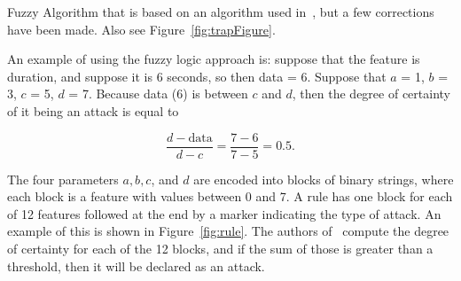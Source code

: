 \documentclass{sig-alternate}
\begin{document}
\begin{algorithm}[t]
\caption{Fuzzy Algorithm that is based on an algorithm used in~\cite{6496342, 6559603}, but a few corrections have been made. Also see Figure~\ref{fig:trapFigure}.}
\label{alg:fuzAlg}
\begin{algorithmic}
\ELSE {}
\ENDIF
\end{algorithmic}
\end{algorithm}

An example of using the fuzzy logic approach is: suppose that the feature is duration, and suppose it is 6 seconds, so then data = 6. Suppose that $a$ = 1, $b$ = 3, $c$ = 5, $d$ = 7. Because data (6) is between $c$ and $d$, then the degree of certainty of it being an attack is equal to

\begin{equation*}
\frac{d-\textrm{data}}{d-c} = \frac{7-6}{7-5} = 0.5.
\end{equation*}




\newpage




The four parameters $a, b, c$, and $d$ are encoded into blocks of binary strings, where each block is a feature with values between 0 and 7. 
A rule has one block for each of 12 features followed at the end by a marker indicating the type of attack. An example of this is shown in Figure~\ref{fig:rule}. The authors of~\cite{6496342, 6559603} compute the degree of certainty for each of the 12 blocks, and if the sum of those is greater than a threshold, then it will be declared as an attack.

\end{document}
